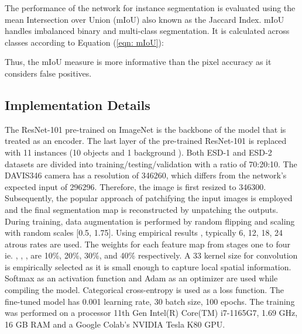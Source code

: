 \documentclass[lettersize,journal]{IEEEtran}
\begin{document}
The performance of the network for instance segmentation is evaluated using the mean Intersection over Union (mIoU) also known as the Jaccard Index. mIoU handles imbalanced binary and multi-class segmentation. It is calculated across classes according to Equation (\ref{eqn: mIoU}):


 
Thus, the mIoU measure is more informative than the pixel accuracy as it considers false positives.




\subsection{\textbf{Implementation Details}}
\label{subsection : Implementation details}

The ResNet-101 pre-trained on ImageNet is the backbone of the model that is treated as an encoder. The last layer of the pre-trained ResNet-101 is replaced with 11 instances (10 objects and 1 background ). Both ESD-1 and ESD-2 datasets are divided into training/testing/validation with a ratio of 70:20:10. The DAVIS346 camera has a resolution of 346260, which differs from the network's expected input of 296296. Therefore, the image is first resized to 346300. Subsequently, the popular approach of patchifying the input images is employed and the final  segmentation map is reconstructed by unpatching the outputs. During training, data augmentation is performed by random flipping and scaling with random scales [0.5, 1.75]. Using empirical results \cite{Chen2018Encoder-DecoderSegmentation}, typically 6, 12, 18, 24 atrous rates are used. The weights for each feature map from stages one to four ie. , , ,   are 10\%, 20\%, 30\%, and 40\% respectively. A 33 kernel size for convolution is empirically selected as it is small enough to capture local spatial information. Softmax as an activation function and Adam as an optimizer are used while compiling the model. Categorical cross-entropy is used as a loss function. The fine-tuned model has 0.001 learning rate, 30 batch size, 100 epochs. The training was performed on a processor 11th Gen Intel(R) Core(TM) i7-1165G7, 1.69 GHz, 16 GB RAM and a Google Colab's NVIDIA Tesla K80 GPU. 

 



 
\end{document}
